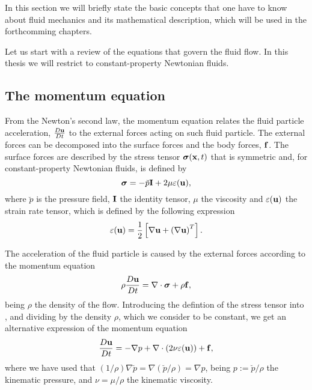In this section we will briefly state the basic concepts that one have to know about fluid mechanics and its mathematical description, which will be used in the forthcomming chapters.

Let us start with a review of the equations that govern the fluid flow. In this thesis we will restrict to constant-property Newtonian fluids. 

\subsection{The momentum equation}
\label{subsec-momentum}
From the Newton's second law, the momentum equation relates the fluid particle acceleration, $\frac{D{\bf u}}{Dt}$ to the external forces acting on such fluid particle. The external forces can be decomposed into the surface forces and the body forces, ${\bf f}$. The surface forces are described by the stress tensor $\boldsymbol{\sigma}({\bf x},t)$ that is symmetric and, for constant-property Newtonian fluids, is defined by
\begin{equation}
\label{eq-stress_tensor_def}
\boldsymbol{\sigma} = -\breve{p}\mathbf{I} + 2\mu\varepsilon({\bf u}), 
\end{equation}
where $\breve{p}$ is the pressure field, $\mathbf{I}$ the identity tensor, $\mu$ the viscosity and $\varepsilon({\bf u})$ the strain rate tensor, which is defined by the following expression
\begin{equation}
\label{eq-strain_tensor_def}
\varepsilon({\bf u})=\frac{1}{2}\left[\nabla{\bf u}+\left(\nabla{\bf u}\right)^T\right].
\end{equation}

The acceleration of the fluid particle is caused by the external forces according to the momentum equation
\begin{equation}
\label{eq-momentum_equation_def1}
\rho\frac{D{\bf u}}{Dt}=\nabla\cdot\boldsymbol{\sigma}+\rho{\bf f},
\end{equation}
being $\rho$ the density of the flow. Introducing the defintion of the stress tensor  into , and dividing by the density $\rho$, which we consider to be constant, we get an alternative expression of the momentum equation
\begin{equation}
\label{eq-momentum_equation_def2}
\frac{D{\bf u}}{Dt}=-\nabla p+\nabla\cdot(2\nu\varepsilon({\bf u}))+{\bf f},
\end{equation}
where we have used that $(1/\rho)\nabla\breve{p}=\nabla(\breve{p}/\rho)=\nabla p$, being $p:=\breve{p}/\rho$ the kinematic pressure, and $\nu=\mu/\rho$ the kinematic viscosity.

